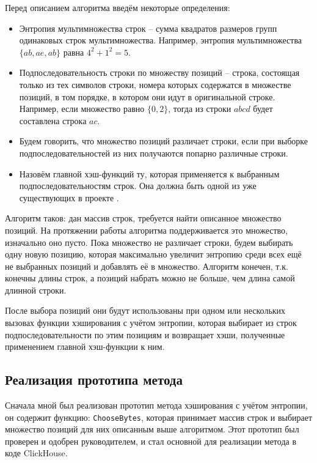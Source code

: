 \documentclass[a4paper,12pt]{extarticle}
\begin{document}
\begin{sloppypar}
Перед описанием алгоритма введём некоторые определения:

\begin{itemize}
	\item Энтропия мультимножества строк -- сумма квадратов размеров групп одинаковых строк мультимножества. Например, энтропия мультимножества $\{ab, ae, ab\}$ равна $4^2+1^2 = 5$.
	\item Подпоследовательность строки по множеству позиций -- строка, состоящая только из тех символов строки, номера которых содержатся в множестве позиций, в том порядке, в котором они идут в оригинальной строке. Например, если множество равно $\{0, 2\}$, тогда из строки $abcd$ будет составлена строка $ac$.
	\item Будем говорить, что множество позиций различает строки, если при выборке подпоследовательностей из них получаются попарно различные строки.
	\item Назовём главной хэш-функций ту, которая применяется к выбранным подпоследовательностям строк. Она должна быть одной из уже существующих в проекте \cite{clickhouse_hash_functions}.
\end{itemize}

Алгоритм таков: дан массив строк, требуется найти описанное множество позиций. На протяжении работы алгоритма поддерживается это множество, изначально оно пусто. Пока множество не различает строки, будем выбирать одну новую позицию, которая максимально увеличит энтропию среди всех ещё не выбранных позиций и добавлять её в множество. Алгоритм конечен, т.к. конечны длины строк, а позиций набрать можно не больше, чем длина самой длинной строки.

После выбора позиций они будут использованы при одном или нескольких вызовах функции хэширования с учётом энтропии, которая выбирает из строк подпоследовательности по этим позициям и возвращает хэши, полученные применением главной хэш-функции к ним.  

\subsection{Реализация прототипа метода}

Сначала мной был реализован прототип метода хэширования с учётом энтропии, он содержит функцию: \texttt{ChooseBytes}, которая принимает массив строк и выбирает множество позиций для них описанным выше алгоритмом. Этот прототип был проверен и одобрен руководителем, и стал основной для реализации метода в коде ClickHouse.


\end{sloppypar}
\end{document}
